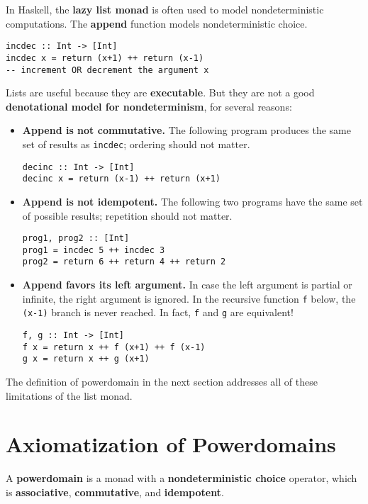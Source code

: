 \documentclass[portrait]{sciposter}
\begin{document}
\begin{multicols}{3}
In Haskell, the \textbf{lazy list monad} is often used to model nondeterministic computations. The \textbf{append} function models nondeterministic choice.

\begin{verbatim}
incdec :: Int -> [Int]
incdec x = return (x+1) ++ return (x-1)
-- increment OR decrement the argument x
\end{verbatim}

Lists are useful because they are \textbf{executable}. But they are not a good \textbf{denotational model for nondeterminism}, for several reasons:

\begin{itemize}
\item \textbf{Append is not commutative.} The following program produces the same set of results as \texttt{incdec}; ordering should not matter.
\begin{verbatim}
decinc :: Int -> [Int]
decinc x = return (x-1) ++ return (x+1)
\end{verbatim}

\item \textbf{Append is not idempotent.} The following two programs have the same set of possible results; repetition should not matter.
\begin{verbatim}
prog1, prog2 :: [Int]
prog1 = incdec 5 ++ incdec 3
prog2 = return 6 ++ return 4 ++ return 2
\end{verbatim}

\item \textbf{Append favors its left argument.} In case the left argument is partial or infinite, the right argument is ignored. In the recursive function \texttt{f} below, the \texttt{(x-1)} branch is never reached. In fact, \texttt{f} and \texttt{g} are equivalent!
\begin{verbatim}
f, g :: Int -> [Int]
f x = return x ++ f (x+1) ++ f (x-1)
g x = return x ++ g (x+1)
\end{verbatim}
\end{itemize}

The definition of powerdomain in the next section addresses all of these limitations of the list monad.

\section{Axiomatization of Powerdomains}
A \textbf{powerdomain} is a monad with a \textbf{nondeterministic choice} operator, which is \textbf{associative}, \textbf{commutative}, and \textbf{idempotent}.


\end{multicols}
\end{document}
